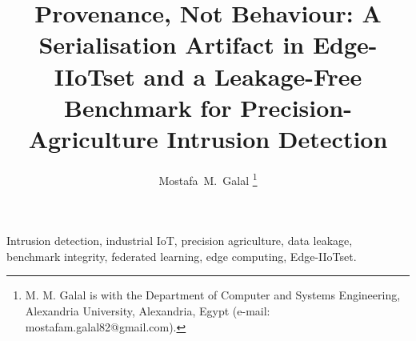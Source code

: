 \documentclass[journal]{IEEEtran}
\begin{document}
\title{Provenance, Not Behaviour: A Serialisation Artifact in Edge-IIoTset and
a Leakage-Free Benchmark for Precision-Agriculture Intrusion Detection}

\author{Mostafa~M.~Galal%
\thanks{M. M. Galal is with the Department of Computer and Systems
Engineering, Alexandria University, Alexandria, Egypt
(e-mail: mostafam.galal82@gmail.com).}}

\maketitle

\begin{abstract}

\end{abstract}

\begin{IEEEkeywords}
Intrusion detection, industrial IoT, precision agriculture, data leakage,
benchmark integrity, federated learning, edge computing, Edge-IIoTset.
\end{IEEEkeywords}





\end{document}
